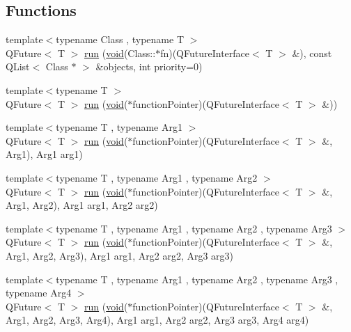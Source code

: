 \subsection*{\-Functions}
\begin{DoxyCompactItemize}
\item 
{\footnotesize template$<$typename Class , typename T $>$ }\\\-Q\-Future$<$ \-T $>$ \hyperlink{namespace_qt_concurrent_a3cb1fa5a72947eea010668284058b19d}{run} (\hyperlink{group___u_a_v_objects_plugin_ga444cf2ff3f0ecbe028adce838d373f5c}{void}(\-Class\-::$\ast$fn)(\-Q\-Future\-Interface$<$ \-T $>$ \&), const \-Q\-List$<$ \-Class $\ast$ $>$ \&objects, int priority=0)
\item 
{\footnotesize template$<$typename T $>$ }\\\-Q\-Future$<$ \-T $>$ \hyperlink{namespace_qt_concurrent_a4bbd2d0ee2b94dec829f50de6786a0ad}{run} (\hyperlink{group___u_a_v_objects_plugin_ga444cf2ff3f0ecbe028adce838d373f5c}{void}($\ast$function\-Pointer)(\-Q\-Future\-Interface$<$ \-T $>$ \&))
\item 
{\footnotesize template$<$typename T , typename Arg1 $>$ }\\\-Q\-Future$<$ \-T $>$ \hyperlink{namespace_qt_concurrent_a462372bff99711567ecffdd2306a2ece}{run} (\hyperlink{group___u_a_v_objects_plugin_ga444cf2ff3f0ecbe028adce838d373f5c}{void}($\ast$function\-Pointer)(\-Q\-Future\-Interface$<$ \-T $>$ \&, \-Arg1), \-Arg1 arg1)
\item 
{\footnotesize template$<$typename T , typename Arg1 , typename Arg2 $>$ }\\\-Q\-Future$<$ \-T $>$ \hyperlink{namespace_qt_concurrent_a0fa3415543c108a43b67e68694a54456}{run} (\hyperlink{group___u_a_v_objects_plugin_ga444cf2ff3f0ecbe028adce838d373f5c}{void}($\ast$function\-Pointer)(\-Q\-Future\-Interface$<$ \-T $>$ \&, \-Arg1, \-Arg2), \-Arg1 arg1, \-Arg2 arg2)
\item 
{\footnotesize template$<$typename T , typename Arg1 , typename Arg2 , typename Arg3 $>$ }\\\-Q\-Future$<$ \-T $>$ \hyperlink{namespace_qt_concurrent_a0019b566db0209f3467eda10c4c496c5}{run} (\hyperlink{group___u_a_v_objects_plugin_ga444cf2ff3f0ecbe028adce838d373f5c}{void}($\ast$function\-Pointer)(\-Q\-Future\-Interface$<$ \-T $>$ \&, \-Arg1, \-Arg2, \-Arg3), \-Arg1 arg1, \-Arg2 arg2, \-Arg3 arg3)
\item 
{\footnotesize template$<$typename T , typename Arg1 , typename Arg2 , typename Arg3 , typename Arg4 $>$ }\\\-Q\-Future$<$ \-T $>$ \hyperlink{namespace_qt_concurrent_a921815afa00b1fd9833d56ac8dfa7106}{run} (\hyperlink{group___u_a_v_objects_plugin_ga444cf2ff3f0ecbe028adce838d373f5c}{void}($\ast$function\-Pointer)(\-Q\-Future\-Interface$<$ \-T $>$ \&, \-Arg1, \-Arg2, \-Arg3, \-Arg4), \-Arg1 arg1, \-Arg2 arg2, \-Arg3 arg3, \-Arg4 arg4)

\end{DoxyCompactItemize}
